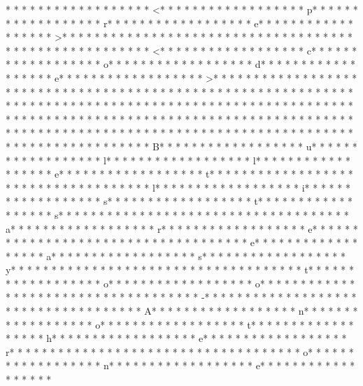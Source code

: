 * * *  * * *  * * *  *  * * *  *  * * *  * <* * *  * * *  * * *  *  * * *  *  * * *  * p* * *  * * *  * * *  *  * * *  *  * * *  * r* * *  * * *  * * *  *  * * *  *  * * *  * e* * *  * * *  * * *  *  * * *  *  * * *  * >* * *  * * *  * * *  *  * * *  *  * * *  * 
* * *  * * *  * * *  *  * * *  *  * * *  * 	* * *  * * *  * * *  *  * * *  *  * * *  * <* * *  * * *  * * *  *  * * *  *  * * *  * c* * *  * * *  * * *  *  * * *  *  * * *  * o* * *  * * *  * * *  *  * * *  *  * * *  * d* * *  * * *  * * *  *  * * *  *  * * *  * e* * *  * * *  * * *  *  * * *  *  * * *  * >* * *  * * *  * * *  *  * * *  *  * * *  * 
* * *  * * *  * * *  *  * * *  *  * * *  * 	* * *  * * *  * * *  *  * * *  *  * * *  * 
* * *  * * *  * * *  *  * * *  *  * * *  * * *  * * *  *  * * *  *  * * *  * * *  * * *  *  * * *  *  * * *  *  * * *  * * *  * * *  *  * * *  *  * * *  *  * * *  * * *  * * *  *  * * *  *  * * *  *  * * *  * * *  * * *  *  * * *  *  * * *  *  * * *  * * *  * * *  *  * * *  *  * * *  *  * * *  * * *  * * *  *  * * *  *  * * *  *  * * *  * * *  * * *  *  * * *  *  * * *  * B* * *  * * *  * * *  *  * * *  *  * * *  * u* * *  * * *  * * *  *  * * *  *  * * *  * l* * *  * * *  * * *  *  * * *  *  * * *  * l* * *  * * *  * * *  *  * * *  *  * * *  * e* * *  * * *  * * *  *  * * *  *  * * *  * t* * *  * * *  * * *  *  * * *  *  * * *  *  * * *  * * *  * * *  *  * * *  *  * * *  * l* * *  * * *  * * *  *  * * *  *  * * *  * i* * *  * * *  * * *  *  * * *  *  * * *  * s* * *  * * *  * * *  *  * * *  *  * * *  * t* * *  * * *  * * *  *  * * *  *  * * *  * s* * *  * * *  * * *  *  * * *  *  * * *  *  * * *  * * *  * * *  *  * * *  *  * * *  * a* * *  * * *  * * *  *  * * *  *  * * *  * r* * *  * * *  * * *  *  * * *  *  * * *  * e* * *  * * *  * * *  *  * * *  *  * * *  *  * * *  * * *  * * *  *  * * *  *  * * *  * e* * *  * * *  * * *  *  * * *  *  * * *  * a* * *  * * *  * * *  *  * * *  *  * * *  * s* * *  * * *  * * *  *  * * *  *  * * *  * y* * *  * * *  * * *  *  * * *  *  * * *  *  * * *  * * *  * * *  *  * * *  *  * * *  * t* * *  * * *  * * *  *  * * *  *  * * *  * o* * *  * * *  * * *  *  * * *  *  * * *  * o* * *  * * *  * * *  *  * * *  *  * * *  * 
* * *  * * *  * * *  *  * * *  *  * * *  * -* * *  * * *  * * *  *  * * *  *  * * *  *  * * *  * * *  * * *  *  * * *  *  * * *  * A* * *  * * *  * * *  *  * * *  *  * * *  * n* * *  * * *  * * *  *  * * *  *  * * *  * o* * *  * * *  * * *  *  * * *  *  * * *  * t* * *  * * *  * * *  *  * * *  *  * * *  * h* * *  * * *  * * *  *  * * *  *  * * *  * e* * *  * * *  * * *  *  * * *  *  * * *  * r* * *  * * *  * * *  *  * * *  *  * * *  *  * * *  * * *  * * *  *  * * *  *  * * *  * o* * *  * * *  * * *  *  * * *  *  * * *  * n* * *  * * *  * * *  *  * * *  *  * * *  * e* * *  * * *  * * *  *  * * *  *  * * *  * 
